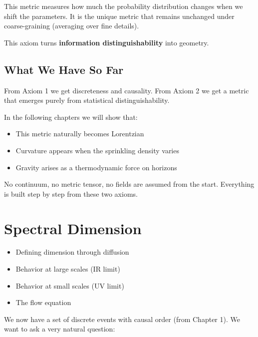 \documentclass[11pt, a4paper, openany]{book}
\newenvironment{introduction}[1][Chapter Overview]{%
  \begin{tcolorbox}[
    enhanced,
    colback=structurecolor!5,
    colframe=structurecolor,
    colbacktitle=structurecolor,
    coltitle=white,
    fonttitle=\bfseries,
    title={#1},
    arc=3pt, boxrule=1pt,
    left=10pt, right=10pt, top=8pt, bottom=8pt,
    before skip=15pt, after skip=15pt
  ]
  \begin{itemize}[leftmargin=*, itemsep=3pt]
}{%
  \end{itemize}
  \end{tcolorbox}
}
\begin{document}
This metric measures how much the probability distribution changes when we shift the parameters.
It is the unique metric that remains unchanged under coarse-graining (averaging over fine details).

\begin{result}
This axiom turns \textbf{information distinguishability} into geometry.
\end{result}

\section{What We Have So Far}

From Axiom 1 we get discreteness and causality.
From Axiom 2 we get a metric that emerges purely from statistical distinguishability.

In the following chapters we will show that:
\begin{itemize}
  \item This metric naturally becomes Lorentzian
  \item Curvature appears when the sprinkling density varies
  \item Gravity arises as a thermodynamic force on horizons
\end{itemize}

No continuum, no metric tensor, no fields are assumed from the start.
Everything is built step by step from these two axioms.


\chapter{Spectral Dimension}

\begin{introduction}
  \item Defining dimension through diffusion
  \item Behavior at large scales (IR limit)
  \item Behavior at small scales (UV limit)
  \item The flow equation
\end{introduction}

We now have a set of discrete events with causal order (from Chapter 1).
We want to ask a very natural question:
\end{document}
